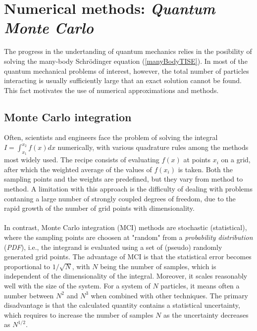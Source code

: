 
\chapter{Numerical methods: \emph{Quantum Monte Carlo}}\label{QMC}
The progress in the undertanding of quantum mechanics relies in the posibility of solving the many-body Schr\"odinger equation (\ref{manyBodyTISE}). In most of the quantum mechanical problems of interest, however, the total number of particles interacting is usually sufficiently large that an exact solution cannot be found. This fact motivates the use of numerical approximations and methods.


\section{Monte Carlo integration}
Often, scientists and engineers face the problem of solving the integral $I = \int_{x_1}^{x_2} f(x) dx$ numerically, with various 
quadrature rules among the methods most widely used. The recipe consists of evaluating $f(x)$ at points $x_i$ on a grid, after which the weighted average of the values of $f(x_i)$ is taken. Both the sampling points and the weights are predefined, but they vary from method to method. A limitation with this approach is the difficulty of dealing with problems contaning a large number of strongly coupled degrees of freedom, due to the rapid growth of the number of grid points with dimensionality.\\
\\
\noindent
In contrast, Monte Carlo integration (MCI) methods are stochastic (statistical), where the sampling points are choosen at "random" from a \emph{probability distribution} (\emph{PDF}), i.e., the integrand is evaluated using a set of (pseudo) randomly generated grid points. The advantage of MCI is that the statistical error becomes proportional to $1/\sqrt{N}$\cite{jensen}, with $N$ being the number of samples, which is independent of the dimensionality of the integral. Moreover, it scales reasonably well with the size of the system. For a system of $N$ particles, it means often a number between $N^2$ and $N^3$ when combined with other techniques. The primary disadvantage is that the calculated quantity contains a statistical uncertainty, which requires to increase the number of samples $N$ as the uncertainty decreases as $N^{1/2}$\cite{Bressanini}.


